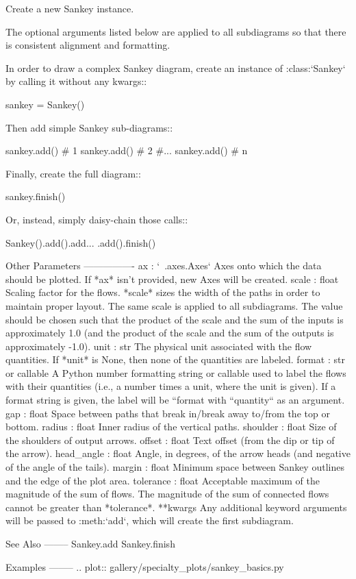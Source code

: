 \begin{DoxyVerb}Create a new Sankey instance.

The optional arguments listed below are applied to all subdiagrams so
that there is consistent alignment and formatting.

In order to draw a complex Sankey diagram, create an instance of
:class:`Sankey` by calling it without any kwargs::

    sankey = Sankey()

Then add simple Sankey sub-diagrams::

    sankey.add() # 1
    sankey.add() # 2
    #...
    sankey.add() # n

Finally, create the full diagram::

    sankey.finish()

Or, instead, simply daisy-chain those calls::

    Sankey().add().add...  .add().finish()

Other Parameters
----------------
ax : `~.axes.Axes`
    Axes onto which the data should be plotted.  If *ax* isn't
    provided, new Axes will be created.
scale : float
    Scaling factor for the flows.  *scale* sizes the width of the paths
    in order to maintain proper layout.  The same scale is applied to
    all subdiagrams.  The value should be chosen such that the product
    of the scale and the sum of the inputs is approximately 1.0 (and
    the product of the scale and the sum of the outputs is
    approximately -1.0).
unit : str
    The physical unit associated with the flow quantities.  If *unit*
    is None, then none of the quantities are labeled.
format : str or callable
    A Python number formatting string or callable used to label the
    flows with their quantities (i.e., a number times a unit, where the
    unit is given). If a format string is given, the label will be
    ``format %
    with ``quantity`` as an argument.
gap : float
    Space between paths that break in/break away to/from the top or
    bottom.
radius : float
    Inner radius of the vertical paths.
shoulder : float
    Size of the shoulders of output arrows.
offset : float
    Text offset (from the dip or tip of the arrow).
head_angle : float
    Angle, in degrees, of the arrow heads (and negative of the angle of
    the tails).
margin : float
    Minimum space between Sankey outlines and the edge of the plot
    area.
tolerance : float
    Acceptable maximum of the magnitude of the sum of flows.  The
    magnitude of the sum of connected flows cannot be greater than
    *tolerance*.
**kwargs
    Any additional keyword arguments will be passed to :meth:`add`,
    which will create the first subdiagram.

See Also
--------
Sankey.add
Sankey.finish

Examples
--------
.. plot:: gallery/specialty_plots/sankey_basics.py
\end{DoxyVerb}
 

